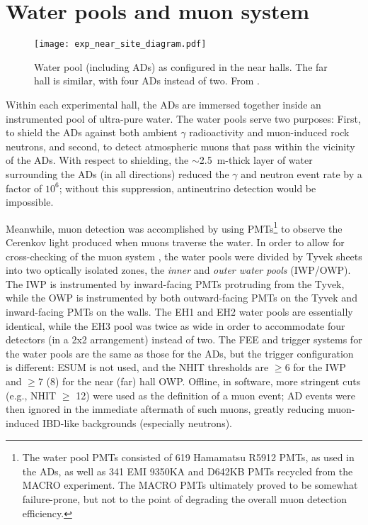 \documentclass[../thesis.tex]{subfiles}
\begin{document}
\section{Water pools and muon system}
\label{sec:expShieldVeto}

\begin{figure}[ht]
  \texttt{[image: exp\_near\_site\_diagram.pdf]}
  \caption{Water pool (including ADs) as configured in the near halls. The far
    hall is similar, with four ADs instead of two. From \cite{An_2017}.}
  \label{fig:expPool}
\end{figure}

Within each experimental hall, the ADs are immersed together inside an
instrumented pool of ultra-pure water. The water pools serve two purposes:
First, to shield the ADs against both ambient $\gamma$ radioactivity and
muon-induced rock neutrons, and second, to detect atmospheric muons that pass
within the vicinity of the ADs. With respect to shielding, the $\sim$2.5~m-thick
layer of water surrounding the ADs (in all directions) reduced the $\gamma$ and
neutron event rate by a factor of $10^6$; without this suppression, antineutrino
detection would be impossible.

Meanwhile, muon detection was accomplished by using PMTs\footnote{The water pool
  PMTs consisted of 619 Hamamatsu R5912 PMTs, as used in the ADs, as well as 341
  EMI 9350KA and D642KB PMTs recycled from the MACRO experiment. The MACRO PMTs
  ultimately proved to be somewhat failure-prone, but not to the point of
  degrading the overall muon detection efficiency.} to observe the Cerenkov
light produced when muons traverse the water. In order to allow for
cross-checking of the muon system \cite{Hack_2014}, the water pools were divided
by Tyvek sheets into two optically isolated zones, the \emph{inner} and
\emph{outer water pools} (IWP/OWP). The IWP is instrumented by inward-facing
PMTs protruding from the Tyvek, while the OWP is instrumented by both
outward-facing PMTs on the Tyvek and inward-facing PMTs on the walls. The EH1
and EH2 water pools are essentially identical, while the EH3 pool was twice as
wide in order to accommodate four detectors (in a 2x2 arrangement) instead of
two. The FEE and trigger systems for the water pools are the same as those for
the ADs, but the trigger configuration is different: ESUM is not used, and the
NHIT thresholds are $\geq$6 for the IWP and $\ge$7 (8) for the near (far) hall
OWP. Offline, in software, more stringent cuts (e.g., NHIT $\geq$ 12) were used
as the definition of a muon event; AD events were then ignored in the immediate
aftermath of such muons, greatly reducing muon-induced IBD-like backgrounds
(especially neutrons).
\end{document}

